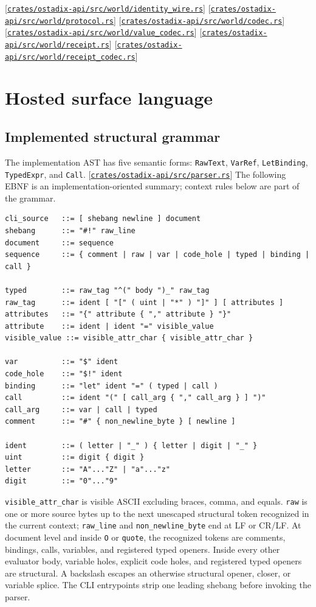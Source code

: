 \documentclass[11pt,oneside]{article}
\newcommand{\src}[1]{\textcolor{OSlate}{\scriptsize[\href{https://github.com/lostadi/OSTADIX/blob/c0b02c326b2329a95ba52447c7180bc93957cd57/#1}{\nolinkurl{#1}}]}\allowbreak}
\begin{document}
\src{crates/ostadix-api/src/world/identity_wire.rs}
\src{crates/ostadix-api/src/world/protocol.rs}
\src{crates/ostadix-api/src/world/codec.rs}
\src{crates/ostadix-api/src/world/value_codec.rs}
\src{crates/ostadix-api/src/world/receipt.rs}
\src{crates/ostadix-api/src/world/receipt_codec.rs}

\section{Hosted surface language}
\label{sec:syntax}

\subsection{Implemented structural grammar}

The implementation AST has five semantic forms:
\texttt{RawText}, \texttt{VarRef}, \texttt{LetBinding},
\texttt{TypedExpr}, and \texttt{Call}. \src{crates/ostadix-api/src/parser.rs}
The following EBNF is an implementation-oriented summary; context rules below
are part of the grammar.

\begin{lstlisting}[style=plaincode]
cli_source   ::= [ shebang newline ] document
shebang      ::= "#!" raw_line
document     ::= sequence
sequence     ::= { comment | raw | var | code_hole | typed | binding | call }

typed        ::= raw_tag "^(" body ")_" raw_tag
raw_tag      ::= ident [ "[" ( uint | "*" ) "]" ] [ attributes ]
attributes   ::= "{" attribute { "," attribute } "}"
attribute    ::= ident | ident "=" visible_value
visible_value ::= visible_attr_char { visible_attr_char }

var          ::= "$" ident
code_hole    ::= "$!" ident
binding      ::= "let" ident "=" ( typed | call )
call         ::= ident "(" [ call_arg { "," call_arg } ] ")"
call_arg     ::= var | call | typed
comment      ::= "#" { non_newline_byte } [ newline ]

ident        ::= ( letter | "_" ) { letter | digit | "_" }
uint         ::= digit { digit }
letter       ::= "A"..."Z" | "a"..."z"
digit        ::= "0"..."9"
\end{lstlisting}

\texttt{visible\_attr\_char} is visible ASCII excluding braces, comma, and
equals. \texttt{raw} is one or more source bytes up to the next unescaped
structural token recognized in the current context; \texttt{raw\_line} and
\texttt{non\_newline\_byte} end at LF or CR/LF. At document level and inside
\texttt{O} or \texttt{quote}, the recognized tokens are comments, bindings,
calls, variables, and registered typed openers. Inside every other evaluator
body, variable holes, explicit code holes, and registered typed openers are structural. A backslash
escapes an otherwise structural opener, closer, or variable splice. The CLI
entrypoints strip one leading shebang before invoking the parser.
\end{document}
